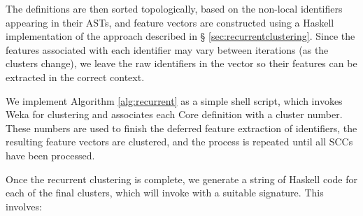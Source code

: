 The definitions are then sorted topologically, based on the non-local
identifiers appearing in their ASTs, and feature vectors are constructed using a
Haskell implementation of the approach described in \S
\ref{sec:recurrentclustering}. Since the features associated with each
identifier may vary between iterations (as the clusters change), we leave the
raw identifiers in the vector so their features can be extracted in the correct
context.

We implement Algorithm \ref{alg:recurrent} as a simple shell script, which
invokes Weka for clustering and associates each Core definition with a cluster
number. These numbers are used to finish the deferred feature extraction of
identifiers, the resulting feature vectors are clustered, and the process is
repeated until all SCCs have been processed.

Once the recurrent clustering is complete, we generate a string of Haskell code
for each of the final clusters, which will invoke \qspec{} with a suitable
signature. This involves:


